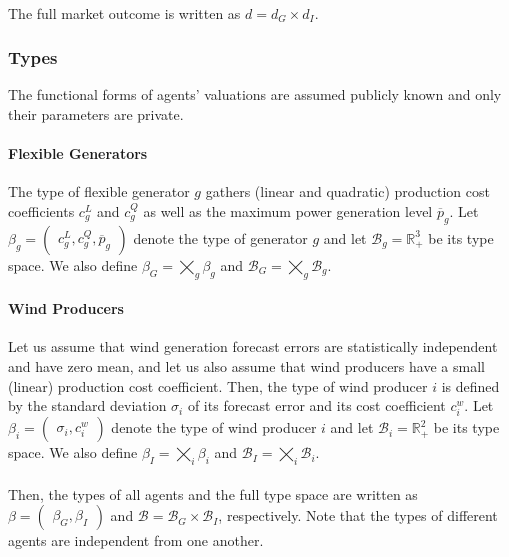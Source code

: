 \documentclass{article}
\begin{document}
\paragraph{} The full market outcome is written as $d = d_G \times d_I$.

\subsubsection{Types}

The functional forms of agents' valuations are assumed publicly known and only their parameters are private.

\paragraph{Flexible Generators} The type of flexible generator $g$ gathers (linear and quadratic) production cost coefficients $c_g^L$ and $c_g^Q$ as well as the maximum power generation level $\overline{p}_g$. Let $\beta_g = \begin{pmatrix} c_g^L, c_g^Q, \overline{p}_g\end{pmatrix}$ denote the type of generator $g$ and let $\mathcal{B}_g = \mathbb{R}_+^3$ be its type space. We also define $\beta_G = \bigtimes_g \beta_g$ and $\mathcal{B}_G = \bigtimes_g \mathcal{B}_g$.

\paragraph{Wind Producers} Let us assume that wind generation forecast errors are statistically independent and have zero mean, and let us also assume that wind producers have a small (linear) production cost coefficient. Then, the type of wind producer $i$ is defined by the standard deviation $\sigma_i$ of its forecast error and its cost coefficient $c_i^w$. Let $\beta_i = \begin{pmatrix}\sigma_i, c_i^w\end{pmatrix}$ denote the type of wind producer $i$ and let $\mathcal{B}_i = \mathbb{R}_+^2$ be its type space. We also define $\beta_I = \bigtimes_i \beta_i$ and $\mathcal{B}_I = \bigtimes_i \mathcal{B}_i$.

\paragraph{} Then, the types of all agents and the full type space are written as $\beta = \begin{pmatrix}\beta_G, \beta_I\end{pmatrix}$ and $\mathcal{B} = \mathcal{B}_G \times \mathcal{B}_I$, respectively. Note that the types of different agents are independent from one another.
\end{document}
